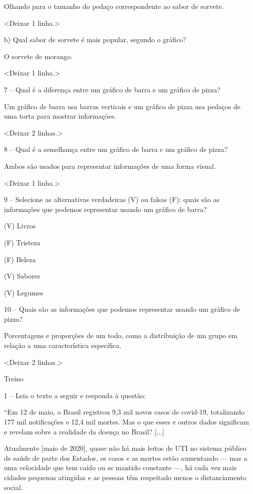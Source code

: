 Olhando para o tamanho do pedaço correspondente ao sabor de sorvete.

\textless{}Deixar 1 linha.\textgreater{}

b) Qual sabor de sorvete é mais popular, segundo o gráfico?

O sorvete de morango.

\textless{}Deixar 1 linha.\textgreater{}

7 -- Qual é a diferença entre um gráfico de barra e um gráfico de pizza?

Um gráfico de barra usa barras verticais e um gráfico de pizza usa
pedaços de uma torta para mostrar informações.

\textless{}Deixar 2 linhas.\textgreater{}

8 -- Qual é a semelhança entre um gráfico de barra e um gráfico de
pizza?

Ambos são usados para representar informações de uma forma visual.

\textless{}Deixar 1 linha.\textgreater{}

9 -- Selecione as alternativas verdadeiras (V) ou falsas (F): quais são
as informações que podemos representar usando um gráfico de barra?

(V) Livros

(F) Tristeza

(F) Beleza

(V) Sabores

(V) Legumes

10 -- Quais são as informações que podemos representar usando um gráfico
de pizza?

Porcentagens e proporções de um todo, como a distribuição de um grupo em
relação a uma característica específica.

\textless{}Deixar 2 linhas.\textgreater{}

Treino

1 -- Leia o texto a seguir e responda à questão:

``Em 12 de maio, o Brasil registrou 9,3 mil novos casos de covid-19,
totalizando 177 mil notificações e 12,4 mil mortes. Mas o que esses e
outros dados significam e revelam sobre a realidade da doença no Brasil?
{[}...{]}

Atualmente {[}maio de 2020{]}, quase não há mais leitos de UTI no
sistema público de saúde de parte dos Estados, os casos e as mortes
estão aumentando --- mas a uma velocidade que tem caído ou se mantido
constante ---, há cada vez mais cidades pequenas atingidas e as pessoas
têm respeitado menos o distanciamento social.

